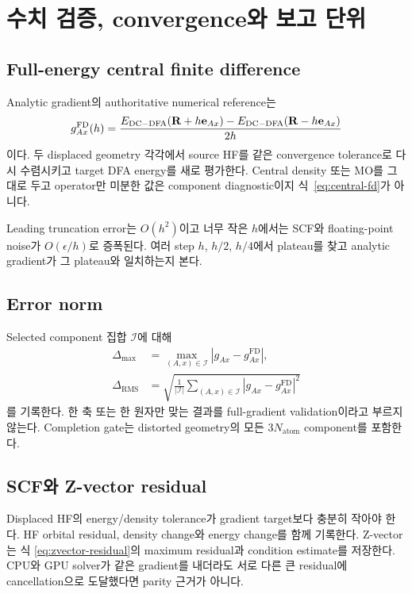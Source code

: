 \section{수치 검증, convergence와 보고 단위}
\label{sec:validation}

\subsection{Full-energy central finite difference}

Analytic gradient의 authoritative numerical reference는
\begin{equation}
  g_{Ax}^{\mathrm{FD}}(h)
  =\frac{E_{\mathrm{DC-DFA}}(\mathbf{R}+h\mathbf e_{Ax})
         -E_{\mathrm{DC-DFA}}(\mathbf{R}-h\mathbf e_{Ax})}{2h}
  \label{eq:central-fd}
\end{equation}
이다. 두 displaced geometry 각각에서 source HF를 같은 convergence tolerance로 다시
수렴시키고 target DFA energy를 새로 평가한다. Central density 또는 MO를 그대로 두고
operator만 미분한 값은 component diagnostic이지 식~\eqref{eq:central-fd}가 아니다.

Leading truncation error는 $O(h^2)$이고 너무 작은 $h$에서는 SCF와 floating-point noise가
$O(\epsilon/h)$로 증폭된다. 여러 step $h$, $h/2$, $h/4$에서 plateau를 찾고 analytic
gradient가 그 plateau와 일치하는지 본다.

\subsection{Error norm}

Selected component 집합 $\mathcal I$에 대해
\begin{align}
  \Delta_{\max}
  &=\max_{(A,x)\in\mathcal I}|g_{Ax}-g_{Ax}^{\mathrm{FD}}|,
  \label{eq:fd-max-error}\\
  \Delta_{\mathrm{RMS}}
  &=\sqrt{\frac1{|\mathcal I|}\sum_{(A,x)\in\mathcal I}
          |g_{Ax}-g_{Ax}^{\mathrm{FD}}|^2}
  \label{eq:fd-rms-error}
\end{align}
를 기록한다. 한 축 또는 한 원자만 맞는 결과를 full-gradient validation이라고 부르지
않는다. Completion gate는 distorted geometry의 모든 $3N_{\mathrm{atom}}$ component를
포함한다.

\subsection{SCF와 Z-vector residual}

Displaced HF의 energy/density tolerance가 gradient target보다 충분히 작아야 한다. HF
orbital residual, density change와 energy change를 함께 기록한다. Z-vector는 식
\eqref{eq:zvector-residual}의 maximum residual과 condition estimate를 저장한다. CPU와 GPU
solver가 같은 gradient를 내더라도 서로 다른 큰 residual에 cancellation으로 도달했다면
parity 근거가 아니다.

